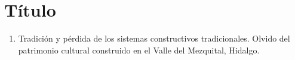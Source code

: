 \section{Título}







%
%

\begin{enumerate}[itemsep=0pt]

	\item Tradición y pérdida de los sistemas constructivos tradicionales. Olvido del patrimonio cultural construido en el Valle del Mezquital, Hidalgo.

\end{enumerate}

